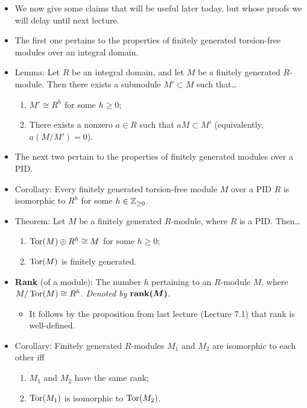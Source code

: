 \documentclass[../notes.tex]{subfiles}
\begin{document}
\begin{itemize}
\begin{enumerate}[label={(\roman*)}]
\begin{proof}
        \end{proof}
    \end{enumerate}
    \item We now give some claims that will be useful later today, but whose proofs we will delay until next lecture.
    \item The first one pertains to the properties of finitely generated torsion-free modules over an integral domain.
    \item Lemma: Let $R$ be an integral domain, and let $M$ be a finitely generated $R$-module. Then there exists a submodule $M'\subset M$ such that\dots
    \begin{enumerate}[label={(\roman*)}]
        \item $M'\cong R^h$ for some $h\geq 0$;
        \item There exists a nonzero $a\in R$ such that $aM\subset M'$ (equivalently, $a(M/M')=0$).
    \end{enumerate}
    \item The next two pertain to the properties of finitely generated modules over a PID.
    \item Corollary: Every finitely generated torsion-free module $M$ over a PID $R$ is isomorphic to $R^h$ for some $h\in{\mathbb{Z}_{\geq 0}}$.
    \item Theorem: Let $M$ be a finitely generated $R$-module, where $R$ is a PID. Then\dots
    \begin{enumerate}[label={(\roman*)}]
        \item $\operatorname{Tor}(M)\oplus R^h\cong M$ for some $h\geq 0$;
        \item $\operatorname{Tor}(M)$ is finitely generated.
    \end{enumerate}
    \item \textbf{Rank} (of a module): The number $h$ pertaining to an $R$-module $M$, where $M/\operatorname{Tor}(M)\cong R^h$. \emph{Denoted by} $\bm{\rank(M)}$.
    \begin{itemize}
        \item It follows by the proposition from last lecture (Lecture 7.1) that rank is well-defined.
    \end{itemize}
    \item Corollary: Finitely generated $R$-modules $M_1$ and $M_2$ are isomorphic to each other iff
    \begin{enumerate}[label={(\roman*)}]
        \item $M_1$ and $M_2$ have the same rank;
        \item $\operatorname{Tor}(M_1)$ is isomorphic to $\operatorname{Tor}(M_2)$.

\end{enumerate}
\end{itemize}
\end{document}
